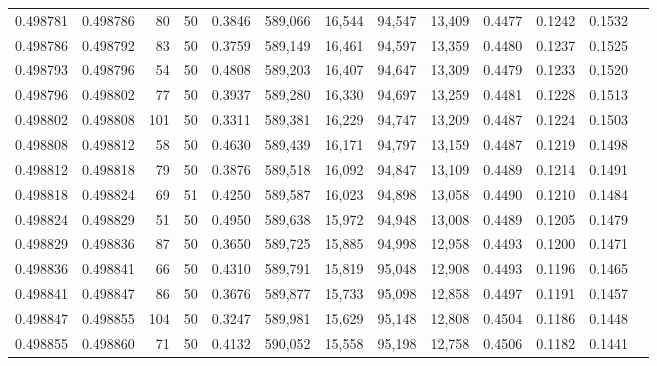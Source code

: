 \begin{tabular}{rrrrrrrrrrrrr}
0.498781 & 0.498786 &    80 &  50 &                                     0.3846 & 589,066 &  16,544 &  94,547 &  13,409 & 0.4477 & 0.1242 & 0.1532 \\
0.498786 & 0.498792 &    83 &  50 &                                     0.3759 & 589,149 &  16,461 &  94,597 &  13,359 & 0.4480 & 0.1237 & 0.1525 \\
0.498793 & 0.498796 &    54 &  50 &                                     0.4808 & 589,203 &  16,407 &  94,647 &  13,309 & 0.4479 & 0.1233 & 0.1520 \\
0.498796 & 0.498802 &    77 &  50 &                                     0.3937 & 589,280 &  16,330 &  94,697 &  13,259 & 0.4481 & 0.1228 & 0.1513 \\
0.498802 & 0.498808 &   101 &  50 &                                     0.3311 & 589,381 &  16,229 &  94,747 &  13,209 & 0.4487 & 0.1224 & 0.1503 \\
0.498808 & 0.498812 &    58 &  50 &                                     0.4630 & 589,439 &  16,171 &  94,797 &  13,159 & 0.4487 & 0.1219 & 0.1498 \\
0.498812 & 0.498818 &    79 &  50 &                                     0.3876 & 589,518 &  16,092 &  94,847 &  13,109 & 0.4489 & 0.1214 & 0.1491 \\
0.498818 & 0.498824 &    69 &  51 &                                     0.4250 & 589,587 &  16,023 &  94,898 &  13,058 & 0.4490 & 0.1210 & 0.1484 \\
0.498824 & 0.498829 &    51 &  50 &                                     0.4950 & 589,638 &  15,972 &  94,948 &  13,008 & 0.4489 & 0.1205 & 0.1479 \\
0.498829 & 0.498836 &    87 &  50 &                                     0.3650 & 589,725 &  15,885 &  94,998 &  12,958 & 0.4493 & 0.1200 & 0.1471 \\
0.498836 & 0.498841 &    66 &  50 &                                     0.4310 & 589,791 &  15,819 &  95,048 &  12,908 & 0.4493 & 0.1196 & 0.1465 \\
0.498841 & 0.498847 &    86 &  50 &                                     0.3676 & 589,877 &  15,733 &  95,098 &  12,858 & 0.4497 & 0.1191 & 0.1457 \\
0.498847 & 0.498855 &   104 &  50 &                                     0.3247 & 589,981 &  15,629 &  95,148 &  12,808 & 0.4504 & 0.1186 & 0.1448 \\
0.498855 & 0.498860 &    71 &  50 &                                     0.4132 & 590,052 &  15,558 &  95,198 &  12,758 & 0.4506 & 0.1182 & 0.1441 \\

\end{tabular}
